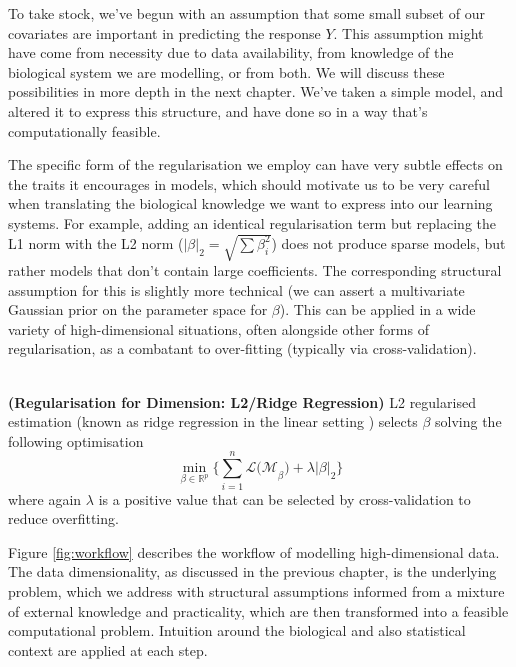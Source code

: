 \documentclass[thesis.tex]{subfiles}
\begin{document}
To take stock, we've begun with an assumption that some small subset of our covariates are important in predicting the response $Y$. This assumption might have come from necessity due to data availability, from knowledge of the biological system we are modelling, or from both. We will discuss these possibilities in more depth in the next chapter. We've taken a simple model, and altered it to express this structure, and have done so in a way that's computationally feasible. 

The specific form of the regularisation we employ can have very subtle effects on the traits it encourages in models, which should motivate us to be very careful when translating the biological knowledge we want to express into our learning systems. For example, adding an identical regularisation term but replacing the L1 norm with the L2 norm ($|\beta|_2 = \sqrt{\sum \beta_i^2}$) does not produce sparse models, but rather models that don't contain large coefficients. The corresponding structural assumption for this is slightly more technical (we can assert a multivariate Gaussian prior on the parameter space for $\beta$). This can be applied in a wide variety of high-dimensional situations, often alongside other forms of regularisation, as a combatant to over-fitting (typically via cross-validation). \\ ~ \\


\begin{technique}{\textbf{(Regularisation for Dimension: L2/Ridge Regression)}}
L2 regularised estimation (known as ridge regression in the linear setting \citep{hoerl_ridge_2000}) selects $\beta$ solving the following optimisation
$$\min_{\beta \in \mathbb{R}^p} \{\sum\limits_{i = 1}^{n} \mathcal{L(M}_\beta) + \lambda |\beta|_2 \} $$
where again $\lambda$ is a positive value that can be selected by cross-validation to reduce overfitting.
\end{technique}

Figure \ref{fig:workflow} describes the workflow of modelling high-dimensional data. The data dimensionality, as discussed in the previous chapter, is the underlying problem, which we address with structural assumptions informed from a mixture of external knowledge and practicality, which are then transformed into a feasible computational problem. Intuition around the biological and also statistical context are applied at each step.
\end{document}

